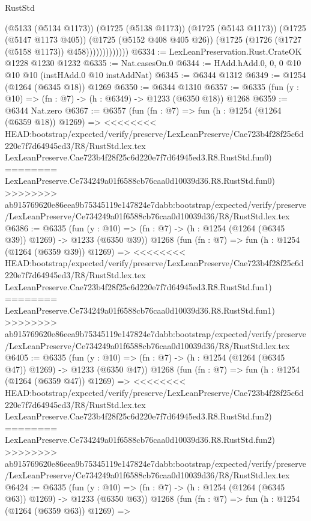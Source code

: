 \begin{lexlean}{RustStd}
\begin{coremodule}
{\begin{coremodule}
{{{{{{{{{{{{{                          (@5133 (@5134 @1173))
                          (@1725 (@5138 @1173))
                          (@1725 (@5143 @1173))
                          (@1725 (@5147 @1173 @405))
                          (@1725 (@5152 @408 @405 @26))
                          (@1725 (@1726 (@1727 (@5158 @1173)) @458)))))))))))))
@6334 := LexLeanPreservation.Rust.CrateOK @1228 @1230 @1232
@6335 := Nat.casesOn.{0}
@6344 := HAdd.hAdd.{0, 0, 0} @10 @10 @10 (instHAdd.{0} @10 instAddNat)
@6345 := @6344 @1312
@6349 := @1254 (@1264 (@6345 @18)) @1269
@6350 := @6344 @1310
@6357 := @6335 (fun (y : @10) => (fn : @7) -> (h : @6349) -> @1233 (@6350 @18)) @1268
@6359 := @6344 Nat.zero
@6367 := @6357
    (fun (fn : @7) =>
    fun (h : @1254 (@1264 (@6359 @18)) @1269) =>
<<<<<<<< HEAD:bootstrap/expected/verify/preserve/LexLeanPreserve/Cae723b4f28f25c6d220e7f7d64945ed3/R8/RustStd.lex.tex
    LexLeanPreserve.Cae723b4f28f25c6d220e7f7d64945ed3.R8.RustStd.fun0)
========
    LexLeanPreserve.Ce734249a01f6588cb76caa0d10039d36.R8.RustStd.fun0)
>>>>>>>> ab915769620e86eea9b75345119e147824e7dabb:bootstrap/expected/verify/preserve/LexLeanPreserve/Ce734249a01f6588cb76caa0d10039d36/R8/RustStd.lex.tex
@6386 := @6335
    (fun (y : @10) => (fn : @7) -> (h : @1254 (@1264 (@6345 @39)) @1269) -> @1233 (@6350 @39))
    @1268
    (fun (fn : @7) =>
    fun (h : @1254 (@1264 (@6359 @39)) @1269) =>
<<<<<<<< HEAD:bootstrap/expected/verify/preserve/LexLeanPreserve/Cae723b4f28f25c6d220e7f7d64945ed3/R8/RustStd.lex.tex
    LexLeanPreserve.Cae723b4f28f25c6d220e7f7d64945ed3.R8.RustStd.fun1)
========
    LexLeanPreserve.Ce734249a01f6588cb76caa0d10039d36.R8.RustStd.fun1)
>>>>>>>> ab915769620e86eea9b75345119e147824e7dabb:bootstrap/expected/verify/preserve/LexLeanPreserve/Ce734249a01f6588cb76caa0d10039d36/R8/RustStd.lex.tex
@6405 := @6335
    (fun (y : @10) => (fn : @7) -> (h : @1254 (@1264 (@6345 @47)) @1269) -> @1233 (@6350 @47))
    @1268
    (fun (fn : @7) =>
    fun (h : @1254 (@1264 (@6359 @47)) @1269) =>
<<<<<<<< HEAD:bootstrap/expected/verify/preserve/LexLeanPreserve/Cae723b4f28f25c6d220e7f7d64945ed3/R8/RustStd.lex.tex
    LexLeanPreserve.Cae723b4f28f25c6d220e7f7d64945ed3.R8.RustStd.fun2)
========
    LexLeanPreserve.Ce734249a01f6588cb76caa0d10039d36.R8.RustStd.fun2)
>>>>>>>> ab915769620e86eea9b75345119e147824e7dabb:bootstrap/expected/verify/preserve/LexLeanPreserve/Ce734249a01f6588cb76caa0d10039d36/R8/RustStd.lex.tex
@6424 := @6335
    (fun (y : @10) => (fn : @7) -> (h : @1254 (@1264 (@6345 @63)) @1269) -> @1233 (@6350 @63))
    @1268
    (fun (fn : @7) =>
    fun (h : @1254 (@1264 (@6359 @63)) @1269) =>
}}}}}}}}}}}}}
\end{coremodule}}
\end{coremodule}
\end{lexlean}
